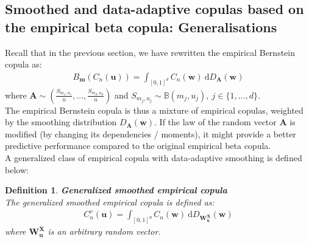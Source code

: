 \documentclass[12pt]{report}
\newtheorem{definition}{Definition}[subsection]
\newcommand{\1}{\mathbf{1}}
\begin{document}
\begin{flushleft}
\newpage
\subsection{Smoothed and data-adaptive copulas based on the empirical beta copula: Generalisations}
\vspace{0.5cm}

Recall that in the previous section, we have rewritten the empirical Bernstein copula as:
\begin{align*}
B_{\boldsymbol{m}}(C_{n}(\boldsymbol{u})) = \int_{[0,1]^d} C_{n}(\boldsymbol{w})  \: \mathrm{d} D_{\boldsymbol{A}}(\boldsymbol{w}) 
\end{align*}
where $\boldsymbol{A} \sim \left(\frac{S_{m_{1},u_{1}}}{n}, \dots, \frac{S_{m_{d},u_{d}}}{n}\right)$ and $S_{m_{j},u_{j}} \sim \mathbb{B}(m_{j},u_{j}), \: j \in \{1, \dots, d \}$. \\
\vspace{0.5cm}
The empirical Bernstein copula is thus a mixture of empirical copulas, weighted by the smoothing distribution $D_{\boldsymbol{A}}(\boldsymbol{w})$. If the law of the random vector $\boldsymbol{A}$ is modified (by changing its dependencies / moments), it might provide a better predictive performance compared to the original empirical beta copula. \\
\vspace{0.5cm}
A generalized class of empirical copula with data-adaptive smoothing is defined below:

\begin{definition}\label{SmoothECDefinition}
\textit{\normalfont\parencite{KojadinovicYi2024Smooth}}\:
\textbf{Generalized smoothed empirical copula} \\
The generalized smoothed empirical copula is defined as:
\begin{align*}
C_{n}^{v}(\boldsymbol{u}) = \int_{[0,1]^d} C_{n}(\boldsymbol{w}) \: \mathrm{d}D_{\boldsymbol{W}_{\boldsymbol{u}}^{\boldsymbol{X}}}(\boldsymbol{w})
\end{align*}
where $\boldsymbol{W}^{\boldsymbol{X}}_{\boldsymbol{u}}$ is an arbitrary random vector.
\end{definition}


\end{flushleft}
\end{document}
